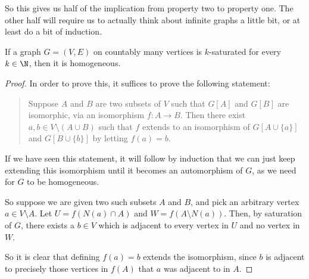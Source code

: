 \documentclass[nobib]{tufte-handout}
\begin{document}
So this gives us half of the implication from property two to property one. The other half will require us to actually think about infinite graphs a little bit, or at least do a bit of induction.

\begin{lemma}\label{lemma:saturated_implies_homogeneous}
    If a graph $G = (V,E)$ on countably many vertices is $k$-saturated for every $k \in \N$, then it is homogeneous.
    
    \begin{proof}
        In order to prove this, it suffices to prove the following statement:
        \begin{quotation}
            Suppose $A$ and $B$ are two subsets of $V$ such that $G[A]$ and $G[B]$ are isomorphic, via an isomorphism $f: A \to B$. Then there exist $a, b \in V\setminus (A \cup B)$ such that $f$ extends to an isomorphism of $G[A \cup \{a\}]$ and $G[B \cup \{b\}]$ by letting $f(a) = b$.
        \end{quotation}

        If we have seen this statement, it will follow by induction that we can just keep extending this isomorphism until it becomes an automorphism of $G$, as we need for $G$ to be homogeneous.

        So suppose we are given two such subsets $A$ and $B$, and pick an arbitrary vertex $a \in V \setminus A$. Let $U = f\left(N(a) \cap A\right)$ and $W = f\left(A \setminus N(a)\right)$. Then, by saturation of $G$, there exists a $b \in V$ which is adjacent to every vertex in $U$ and no vertex in $W$.

        So it is clear that defining $f(a) = b$ extends the isomorphism, since $b$ is adjacent to precisely those vertices in $f(A)$ that $a$ was adjacent to in $A$.
    \end{proof}
\end{lemma}
\end{document}
